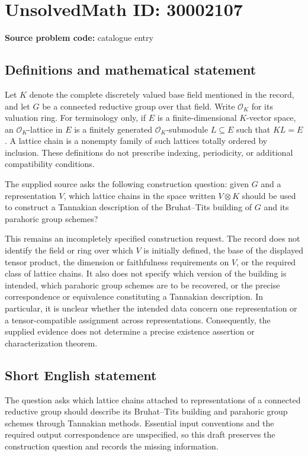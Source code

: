 \documentclass[11pt]{article}
\begin{document}
\section*{UnsolvedMath ID: 30002107}
\textbf{Source problem code:} catalogue entry
\subsection{Definitions and mathematical statement}
Let \(K\) denote the complete discretely valued base field mentioned in the record, and let \(G\) be a connected reductive group over that field. Write \(\mathcal O_K\) for its valuation ring. For terminology only, if \(E\) is a finite-dimensional \(K\)-vector space, an \(\mathcal O_K\)-lattice in \(E\) is a finitely generated \(\mathcal O_K\)-submodule \(L\subseteq E\) such that \(K L=E\). A lattice chain is a nonempty family of such lattices totally ordered by inclusion. These definitions do not prescribe indexing, periodicity, or additional compatibility conditions.

The supplied source asks the following construction question: given \(G\) and a representation \(V\), which lattice chains in the space written \(V\otimes K\) should be used to construct a Tannakian description of the Bruhat--Tits building of \(G\) and its parahoric group schemes?

This remains an incompletely specified construction request. The record does not identify the field or ring over which \(V\) is initially defined, the base of the displayed tensor product, the dimension or faithfulness requirements on \(V\), or the required class of lattice chains. It also does not specify which version of the building is intended, which parahoric group schemes are to be recovered, or the precise correspondence or equivalence constituting a Tannakian description. In particular, it is unclear whether the intended data concern one representation or a tensor-compatible assignment across representations. Consequently, the supplied evidence does not determine a precise existence assertion or characterization theorem.
\subsection{Short English statement}
The question asks which lattice chains attached to representations of a connected reductive group should describe its Bruhat--Tits building and parahoric group schemes through Tannakian methods. Essential input conventions and the required output correspondence are unspecified, so this draft preserves the construction question and records the missing information.
\end{document}
